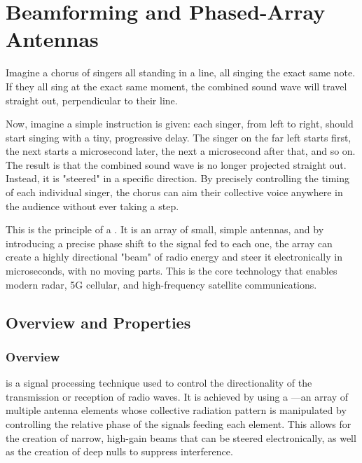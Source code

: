 
\chapter{Beamforming and Phased-Array Antennas}
\label{ch:beamforming}

\begin{nontechnical}
    Imagine a chorus of singers all standing in a line, all singing the exact same note. If they all sing at the exact same moment, the combined sound wave will travel straight out, perpendicular to their line.

    Now, imagine a simple instruction is given: each singer, from left to right, should start singing with a tiny, progressive delay. The singer on the far left starts first, the next starts a microsecond later, the next a microsecond after that, and so on. The result is that the combined sound wave is no longer projected straight out. Instead, it is "steered" in a specific direction. By precisely controlling the timing of each individual singer, the chorus can aim their collective voice anywhere in the audience without ever taking a step.

    This is the principle of a . It is an array of small, simple antennas, and by introducing a precise phase shift to the signal fed to each one, the array can create a highly directional "beam" of radio energy and steer it electronically in microseconds, with no moving parts. This is the core technology that enables modern radar, 5G cellular, and high-frequency satellite communications.
\end{nontechnical}

\section{Overview and Properties}

\subsection{Overview}

 is a signal processing technique used to control the directionality of the transmission or reception of radio waves. It is achieved by using a —an array of multiple antenna elements whose collective radiation pattern is manipulated by controlling the relative phase of the signals feeding each element. This allows for the creation of narrow, high-gain beams that can be steered electronically, as well as the creation of deep nulls to suppress interference.

